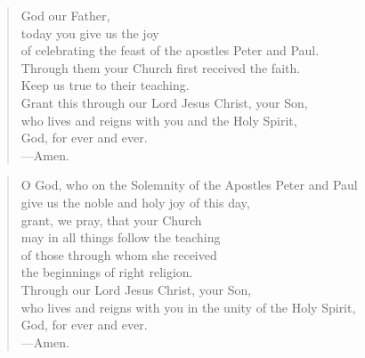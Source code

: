 \prayer

\setlength{\vleftmargin}{\prayerleftmargini}

\begin{verse}
God our Father,\\
today you give us the joy\\
of celebrating the feast of the apostles Peter and Paul.\\
Through them your Church first received the faith.\\
Keep us true to their teaching.\\
Grant this through our Lord Jesus Christ, your Son,\\
who lives and reigns with you and the Holy Spirit,\\
God, for ever and ever.\\
{\color{red}---\thinspace}Amen.
\end{verse}


\begin{verse}
O God, who on the Solemnity of the Apostles Peter and Paul\\
give us the noble and holy joy of this day,\\
grant, we pray, that your Church\\
may in all things follow the teaching\\
of those through whom she received\\
the beginnings of right religion.\\
Through our Lord Jesus Christ, your Son,\\
who lives and reigns with you in the unity of the Holy Spirit,\\
God, for ever and ever.\\
{\color{red}---\thinspace}Amen.
\end{verse}

\setlength{\vleftmargin}{\defleftmargini}
